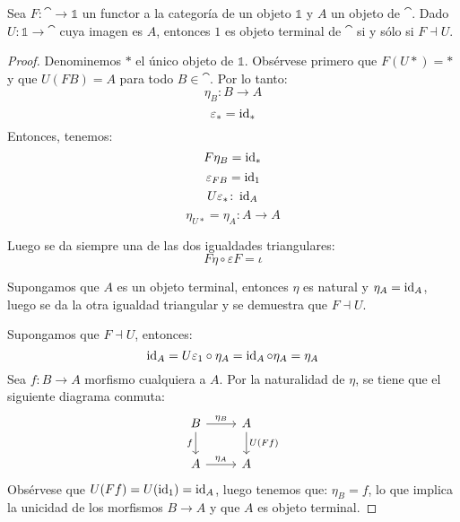 \begin{proposition}
Sea $F \colon \cat \to \mathbb{1}$ un functor a la categoría de un objeto $\mathbb{1}$ y $A$ un objeto de $\cat$.
Dado $U \colon \mathbb{1} \to \cat$ cuya imagen es $A$, entonces $1$ es objeto terminal de $\cat$ si y sólo si $F \dashv U$.
\end{proposition}
\begin{proof}
Denominemos $*$ el único objeto de $\mathbb{1}$.
Obsérvese primero que $F (U *) = *$ y que $U (F B) = A$ para todo $B \in \cat$. Por lo tanto:
\[ \eta_B \colon B \to A \]
\[ \varepsilon_* = \operatorname{id}_* \]
Entonces, tenemos:
\[ F\eta_B = \operatorname{id}_* \]
\[ \varepsilon_{F B} = \operatorname{id}_1\]
\[ U\varepsilon_* \colon \operatorname{id}_A \]
\[ \eta_{U *} = \eta_A \colon A \to A \]

Luego se da siempre una de las dos igualdades triangulares:
\[ F\eta \circ \varepsilon F = \iota \]

Supongamos que $A$ es un objeto terminal, entonces $\eta$ es natural y $\eta_A = \operatorname{id}_A$, luego se da la otra igualdad triangular y se demuestra que $F \dashv U$.

Supongamos que $F \dashv U$, entonces:
\[ \operatorname{id}_A = U \varepsilon_1 \circ \eta_A = \operatorname{id}_A \circ \eta_A = \eta_A \]
Sea $f \colon B \to A$ morfismo cualquiera a $A$.
Por la naturalidad de $\eta$, se tiene que el siguiente diagrama conmuta:
\[\begin{tikzcd}
B \arrow[r,"\eta_B"] \arrow[d,"f" left] & A \arrow[d,"U(F f)"]\\
A \arrow[r,"\eta_A"] & A
\end{tikzcd}\]
Obsérvese que $U (F f) = U (\operatorname{id}_1) = \operatorname{id}_A$, luego tenemos que: $\eta_B = f$, lo que implica la unicidad de los morfismos $B \to A$ y que $A$ es objeto terminal.
\end{proof}
